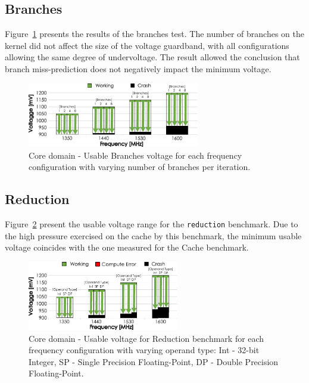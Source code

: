 \subsection{Branches}


Figure~\ref{fig:Branches_guardband} presents the results of the branches test. The number of branches on the kernel did not affect the size of the voltage guardband, with all configurations allowing the same degree of undervoltage.
The result allowed the conclusion that branch miss-prediction does not negatively impact the minimum voltage.

\begin{figure}[htb]
  \centering
  \includegraphics[width=0.67\textwidth]{Figures/GPU_characterization/Branches_guardband.pdf}
  \caption{Core domain - Usable Branches voltage for each frequency configuration with varying number of branches per iteration.}
  \label{fig:Branches_guardband}
\end{figure}

\subsection{Reduction}

Figure~\ref{fig:Reduction_guardband} present the usable voltage range for the \texttt{reduction} benchmark. Due to the high pressure exercised on the cache by this benchmark, the minimum usable voltage coincides with the one measured for the Cache benchmark.

\begin{figure}[htb]
  \centering
  \includegraphics[width=0.59\textwidth]{Figures/GPU_characterization/Reduction_guardband.pdf}
  \caption{Core domain - Usable voltage for Reduction benchmark for each frequency configuration with varying operand type: Int - 32-bit Integer, SP - Single Precision Floating-Point, DP - Double Precision Floating-Point.}
  \label{fig:Reduction_guardband}
\end{figure}


